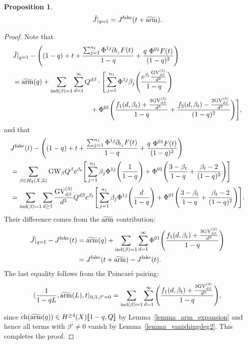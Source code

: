 \documentclass[11pt]{amsart}
\newtheorem{proposition}[theorem]{Proposition}
\newtheorem*{main theorem*}{Main Theorem}
\theoremstyle{remark}
\numberwithin{equation}{section}
\newcommand{\ch}{{\rm ch}}
\newcommand{\fake}{{\rm fake}}
\newcommand{\arm}{{\rm arm}}
\newcommand{\GW}{{\mathrm{GW}}}
\newcommand{\GV}{{\mathrm{GV}}}
\begin{document}
\begin{proposition} \label{prop_J_q=1}
\[
\tilde{J}|_{q=1} = J^{\fake}(t + \widetilde{\arm}).
\]
\end{proposition}
\begin{proof}
Note that
\[
\begin{split}
    &\tilde{J}|_{q=1} - \Bigg( (1-q) + t +   \frac{ \sum_{j=1}^{n_1}\Phi^{1j} \partial_{t_j}F(t)  }{1-q} + \frac{q\ \Phi^{01} F(t)}{(1-q)^2} \Bigg) 
    \\
    &=\widetilde{\arm} (q) + \sum_{{\rm ind}(\beta)=1} \sum_{d=1}^{\infty} Q^{d\beta} \cdot \Bigg[ \sum_{j=1}^{n_1} \Phi^{1j} \beta_j \Bigg( \frac{ e^{\beta_t} \frac{\GV_{d\beta}^{(3)}}{d^2} }{1-q} \Bigg) 
    \\
    &\hspace{40mm} + \Phi^{01} \Bigg( \frac{ f_1(d,\beta_t) + \frac{3\GV_{d\beta}^{(3)}}{d^3} }{1-q} + \frac{ f_2(d,\beta_t) -\frac{2\GV_{d\beta}^{(3)}}{d^3} }{(1-q)^2} \Bigg) \Bigg],
\end{split}
\]
and that 
\[
\begin{split}
    & J^{\fake}(t) - \Bigg( (1-q) + t +   \frac{ \sum_{j=1}^{n_1}\Phi^{1j} \partial_{t_j}F(t)  }{1-q} + \frac{q\ \Phi^{01} F(t)}{(1-q)^2} \Bigg)
    \\
    &= \sum_{\beta \in H_2(X,\mathbb{Z})}  \GW_{\beta} Q^{\beta} e^{\beta_t} \Bigg[ \sum_{j=1}^{n_1} \beta_j\Phi^{1j} \Bigg( \frac{1}{1-q}\Bigg) + \Phi^{01} \Bigg( \frac{3-\beta_t}{1-q} + \frac{\beta_t -2 }{(1-q)^2} \Bigg) \Bigg]
    \\
    &= \sum_{{\rm ind}(\beta)=1} \sum_{d\geq 1} \frac{\GV_{d\beta}^{(3)}}{d^3} Q^{d\beta} e^{\beta_t} \Bigg[ \sum_{j=1}^{n_1} \beta_j \Phi^{1j} \Bigg( \frac{d}{1-q}  \Bigg) + \Phi^{01} \Bigg( \frac{3-\beta_t}{1-q} + \frac{\beta_t -2 }{(1-q)^2} \Bigg)  \Bigg].
\end{split}
\]
Their difference comes from the $\widetilde{\arm}$ contribution:
\[
\begin{split}
    \tilde{J}|_{q=1} - J^{\fake}(t) &= \widetilde{\arm} (q) + \sum_{{\rm ind}(\beta)=1} \sum_{d=1}^{\infty} \Phi^{01} \Bigg( \frac{f_1(d,\beta_t) + \frac{3\GV_{d\beta}^{(3)}}{d^3} }{1-q} \Bigg) 
    \\
    &= J^{\fake}(t+ \widetilde{\arm}) - J^{\fake}(t).
\end{split}
\]
The last equality follows from the Poincar\'e pairing:
\[
\langle \frac{1}{1-qL}, \widetilde{\arm} (L), t \rangle_{0,3,\beta'=0} = \sum_{{\rm ind}(\beta)=1} \sum_{d=1}^{\infty} \Bigg( \frac{f_1(d,\beta_t) + \frac{3\GV_{d\beta}^{(3)}}{d^3} }{1-q} \Bigg),
\]
since $\ch(\widetilde{\arm} (q)) \in H^{\geq 4}(X)[\![1- q,Q]\!]$ by Lemma~\ref{lemma_arm_expansion} and hence all terms with $\beta'\neq 0$ vanish by Lemma~\ref{lemma_vanishingdeg2}. This completes the proof.
\end{proof}
\end{document}
